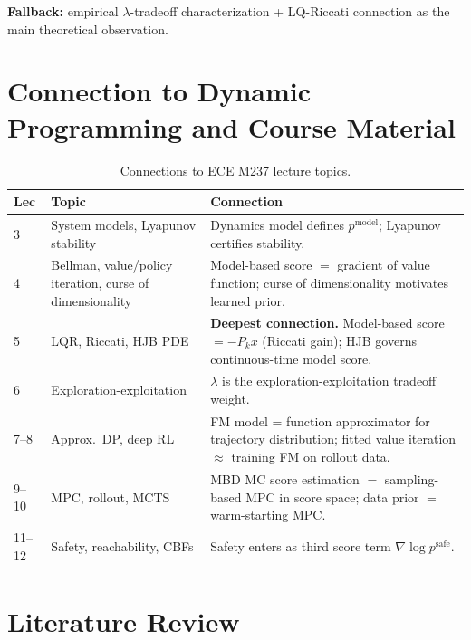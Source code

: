 \documentclass[letterpaper, 10pt, conference]{ieeeconf}
\begin{document}
\textbf{Fallback:} empirical $\lambda$-tradeoff characterization + LQ-Riccati
connection as the main theoretical observation.

\section{Connection to Dynamic Programming and Course Material}
\label{sec:dp_connection}

\begin{table}[h]
  \centering
  \caption{Connections to ECE M237 lecture topics.}
  \label{tab:dp}
  \small
  \begin{tabular}{p{0.8cm}p{3.0cm}p{3.5cm}}
    \toprule
    \textbf{Lec} & \textbf{Topic} & \textbf{Connection} \\
    \midrule
    3 & System models, Lyapunov stability
      & Dynamics model defines $p^{\mathrm{model}}$; Lyapunov certifies stability. \\
    4 & Bellman, value/policy iteration, curse of dimensionality
      & Model-based score $=$ gradient of value function; curse of dimensionality motivates learned prior. \\
    5 & LQR, Riccati, HJB PDE
      & \textbf{Deepest connection.} Model-based score $= -P_k x$ (Riccati gain); HJB governs continuous-time model score. \\
    6 & Exploration-exploitation
      & $\lambda$ is the exploration-exploitation tradeoff weight. \\
    7--8 & Approx.\ DP, deep RL
      & FM model = function approximator for trajectory distribution; fitted value iteration $\approx$ training FM on rollout data. \\
    9--10 & MPC, rollout, MCTS
      & MBD MC score estimation $=$ sampling-based MPC in score space; data prior $=$ warm-starting MPC. \\
    11--12 & Safety, reachability, CBFs
      & Safety enters as third score term $\nabla\log p^{\mathrm{safe}}$. \\
    \bottomrule
  \end{tabular}
\end{table}

\section{Literature Review}
\label{sec:litreview}
\end{document}

